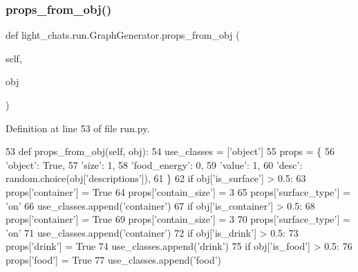 \subsubsection{\texorpdfstring{props\+\_\+from\+\_\+obj()}{props\_from\_obj()}}
{\footnotesize\ttfamily def light\+\_\+chats.\+run.\+Graph\+Generator.\+props\+\_\+from\+\_\+obj (\begin{DoxyParamCaption}\item[{}]{self,  }\item[{}]{obj }\end{DoxyParamCaption})}



Definition at line 53 of file run.\+py.


\begin{DoxyCode}
53     \textcolor{keyword}{def }props\_from\_obj(self, obj):
54         use\_classes = [\textcolor{stringliteral}{'object'}]
55         props = \{
56             \textcolor{stringliteral}{'object'}: \textcolor{keyword}{True},
57             \textcolor{stringliteral}{'size'}: 1,
58             \textcolor{stringliteral}{'food\_energy'}: 0,
59             \textcolor{stringliteral}{'value'}: 1,
60             \textcolor{stringliteral}{'desc'}: random.choice(obj[\textcolor{stringliteral}{'descriptions'}]),
61         \}
62         \textcolor{keywordflow}{if} obj[\textcolor{stringliteral}{'is\_surface'}] > 0.5:
63             props[\textcolor{stringliteral}{'container'}] = \textcolor{keyword}{True}
64             props[\textcolor{stringliteral}{'contain\_size'}] = 3
65             props[\textcolor{stringliteral}{'surface\_type'}] = \textcolor{stringliteral}{'on'}
66             use\_classes.append(\textcolor{stringliteral}{'container'})
67         \textcolor{keywordflow}{if} obj[\textcolor{stringliteral}{'is\_container'}] > 0.5:
68             props[\textcolor{stringliteral}{'container'}] = \textcolor{keyword}{True}
69             props[\textcolor{stringliteral}{'contain\_size'}] = 3
70             props[\textcolor{stringliteral}{'surface\_type'}] = \textcolor{stringliteral}{'on'}
71             use\_classes.append(\textcolor{stringliteral}{'container'})
72         \textcolor{keywordflow}{if} obj[\textcolor{stringliteral}{'is\_drink'}] > 0.5:
73             props[\textcolor{stringliteral}{'drink'}] = \textcolor{keyword}{True}
74             use\_classes.append(\textcolor{stringliteral}{'drink'})
75         \textcolor{keywordflow}{if} obj[\textcolor{stringliteral}{'is\_food'}] > 0.5:
76             props[\textcolor{stringliteral}{'food'}] = \textcolor{keyword}{True}
77             use\_classes.append(\textcolor{stringliteral}{'food'})

\end{DoxyCode}

